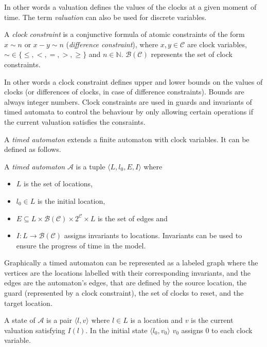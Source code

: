 In other words a valuation defines the values of the clocks at a given moment of time. The term \emph{valuation} can also be used for discrete variables.

\begin{dfn}
	A \emph{clock constraint} is a conjunctive formula of atomic
	constraints of the form $x \sim n$ or $x - y \sim n$ (\emph{difference
		constraint}), where $x,y \in \mathcal{C}$ are clock variables, $\sim \in
	\{\leq,<,=,>,\geq\}$ and \hbox{$n \in \mathbb{N}$}. $\mathcal{B}(\mathcal{C})$ represents the set of clock
	constraints.
\end{dfn}

In other words a clock constraint defines upper and lower bounds on the values of clocks (or differences of clocks, in case of difference constraints). Bounds are always integer numbers. Clock constraints are used in guards and invariants of timed automata to control the behaviour by only allowing certain operations if the current valuation satisfies the consraints. 

A \emph{timed automaton} extends a finite automaton with clock variables. It can be defined as follows.

\begin{dfn}
A \emph{timed automaton} $\mathcal{A}$ is a tuple $\langle L, l_0,
E, I\rangle$ where
\begin{itemize}
	\item $L$ is the set of locations,
	\item $l_0 \in L$ is the initial location,
	\item $E \subseteq L \times \mathcal{B}(\mathcal{C}) \times 2^\mathcal{C} \times L$ is the set of edges and
	\item $I: L \to \mathcal{B}(\mathcal{C})$ assigns invariants to locations.  Invariants can be used to ensure the progress of time in the model. \cite{bengtsson2004timed}
\end{itemize}
\end{dfn}

Graphically a timed automaton can be represented as a labeled graph where the vertices are the locations labelled with their corresponding invariants, and the edges are the automaton's edges, that are defined by the source location, the guard (represented by a clock constraint), the set of clocks to reset, and the target location.


A state of $\mathcal{A}$ is a pair $\langle l,v \rangle$ where $l \in L$ is a
location and $v$ is the current valuation satisfying $I(l)$. In the initial
state $\langle l_0,v_0 \rangle$ $v_0$ assigns 0 to each clock variable.

